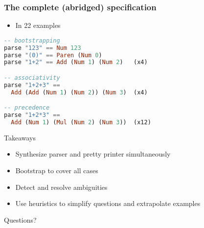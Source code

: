 \begin{frame}[fragile]
\frametitle{The complete {\small(abridged)} specification}

\begin{itemize}
\item{In 22 examples}
\end{itemize}

\begin{lstlisting}[mathescape,language=haskell]
-- bootstrapping
parse "123" == Num 123
parse "(0)" == Paren (Num 0)
parse "1+2" == Add (Num 1) (Num 2)   (x4)

-- associativity
parse "1+2+3" ==
  Add (Add (Num 1) (Num 2)) (Num 3)  (x4)

-- precedence
parse "1+2*3" ==
  Add (Num 1) (Mul (Num 2) (Num 3))  (x12)
\end{lstlisting}

\end{frame}

\begin{frame}{Takeaways}
\begin{itemize}
\item Synthesize parser and pretty printer simultaneously
\item Bootstrap to cover all cases
\item Detect and resolve ambiguities
\item Use heuristics to simplify questions and extrapolate examples
\end{itemize}
\end{frame}

\begin{frame}{Questions?}

\end{frame}